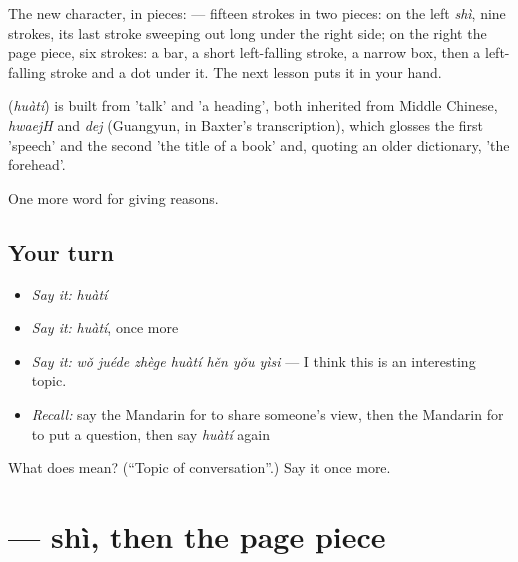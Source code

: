 The new character, in pieces:  — fifteen strokes in two pieces: on the left  \emph{shì}, nine strokes, its last stroke sweeping out long under the right side; on the right the page piece, six strokes: a bar, a short left-falling stroke, a narrow box, then a left-falling stroke and a dot under it. The next lesson puts it in your hand.

\begin{cousinweb}
\textbf{} (\emph{huàtí}) is built from  'talk' and  'a heading', both inherited from Middle Chinese, \emph{hwaejH} and \emph{dej} (Guangyun, in Baxter's transcription), which glosses the first 'speech' and the second 'the title of a book' and, quoting an older dictionary, 'the forehead'.
\end{cousinweb}

\begin{grammarlens}[title={What you've built}]
One more word for giving reasons.
\end{grammarlens}

\subsection*{Your turn}
\begin{itemize}
\raggedright
  \item \emph{Say it:} \emph{huàtí}
  \item \emph{Say it:} \emph{huàtí}, once more
  \item \emph{Say it:} \emph{wǒ juéde zhège huàtí hěn yǒu yìsi} — I think this is an interesting topic.
  \item \emph{Recall:} say the Mandarin for to share someone's view, then the Mandarin for to put a question, then say \emph{huàtí} again
\end{itemize}

\begin{tcolorbox}[breakable,colback=teal!4,colframe=teal!35!black,title={Before you move on}]
What does  mean? (\textquotedblleft{}Topic of conversation\textquotedblright{}.) Say it once more.
\end{tcolorbox}
\section[\texorpdfstring{\zh{题} (tí)}{题 (tí)}]{ — shì, then the page piece}

\label{lesson:ZH-W354-ti-topic}



